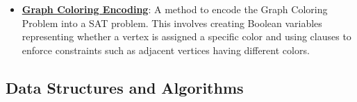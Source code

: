 \documentclass{article}%
\begin{document}
\begin{itemize}[leftmargin=*]
\item \href{https://purdue.brightspace.com/d2l/common/assets/pdfjs-d2l-dist/1.0.14-legacy/web/viewer.html?file=\%2Fcontent\%2Fenforced\%2F1095467-wl.202510.CS.24300.001\%2F15L2-SAT.pdf\%3Fou\%3D1095467\&lang=en-us\&container=d2l-fileviewer-rendered-pdf\&fullscreen=d2l-fileviewer-rendered-pdf-dialog\&height=667#page=47}{\textbf{Graph Coloring Encoding}}: A method to encode the Graph Coloring Problem into a SAT problem. This involves creating Boolean variables representing whether a vertex is assigned a specific color and using clauses to enforce constraints such as adjacent vertices having different colors.%
\end{itemize}

%
\subsection{Data Structures and Algorithms}%
\label{subsec:DataStructuresandAlgorithms}%
\end{document}
